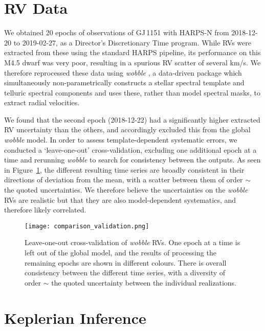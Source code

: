 \documentclass[modern]{aastex62}
\begin{document}
\section{RV Data}
\label{sec:k2}

We obtained 20 epochs of observations of GJ\,1151 with HARPS-N from 2018-12-20 to 2019-02-27, as a Director's Discretionary Time program. While RVs were extracted from these using the standard HARPS pipeline, its performance on this M4.5 dwarf was very poor, resulting in a spurious RV scatter of several km/s. We therefore reprocessed these data using \textit{wobble} \citep{wobble}, a data-driven package which simultaneously non-parametrically constructs a stellar spectral template and telluric spectral components and uses these, rather than model spectral masks, to extract radial velocities. 

We found that the second epoch (2018-12-22) had a significantly higher extracted RV uncertainty than the others, and accordingly excluded this from the global \textit{wobble} model. In order to assess template-dependent systematic errors, we conducted a `leave-one-out' cross-validation, excluding one additional epoch at a time and rerunning \textit{wobble} to search for consistency between the outputs. As seen in Figure~\ref{xvalidation}, the different resulting time series are broadly consistent in their directions of deviation from the mean, with a scatter between them of order $\sim$ the quoted uncertainties. We therefore believe the uncertainties on the \textit{wobble} RVs are realistic but that they are also model-dependent systematics, and therefore likely correlated. 

\begin{figure}
\noindent\texttt{[image: comparison\_validation.png]}

\caption{\label{xvalidation}
Leave-one-out cross-validation of \textit{wobble} RVs. One epoch at a time is left out of the global model, and the results of processing the remaining epochs are shown in different colours. There is overall consistency between the different time series, with a diversity of order $\sim$ the quoted uncertainty between the individual realizations. %
}
\end{figure}

\section{Keplerian Inference}
\label{sec:joker}
\end{document}
